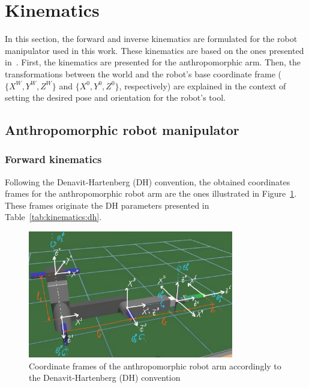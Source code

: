 \documentclass[10pt,a4paper,notitlepage,twocolumn,twoside]{article}
\begin{document}
\section{Kinematics}
\label{sec:kinematics}

In this section, the forward and inverse kinematics are formulated for the robot manipulator used in this work. These kinematics are based on the ones presented in~\cite{book:spong:2005}. First, the kinematics are presented for the anthropomorphic arm. Then, the transformations between the world and the robot's base coordinate frame ($\{X^W,Y^W,Z^W\}$ and $\{X^0,Y^0,Z^0\}$, respectively) are explained in the context of setting the desired pose and orientation for the robot's tool.

\subsection{Anthropomorphic robot manipulator}

\subsubsection{Forward kinematics}

Following the Denavit-Hartenberg (DH) convention, the obtained coordinates frames for the anthropomorphic robot arm are the ones illustrated in Figure~\ref{fig:kinematics:frames}. These frames originate the DH parameters presented in Table~\ref{tab:kinematics:dh}.

\begin{figure}[!t]
  \centering
  \includegraphics[width=0.8\textwidth]{images/kinematics-forward_v2.png}
  \caption{Coordinate frames of the anthropomorphic robot arm accordingly to the Denavit-Hartenberg (DH) convention}
  \label{fig:kinematics:frames}
\end{figure}
\end{document}
